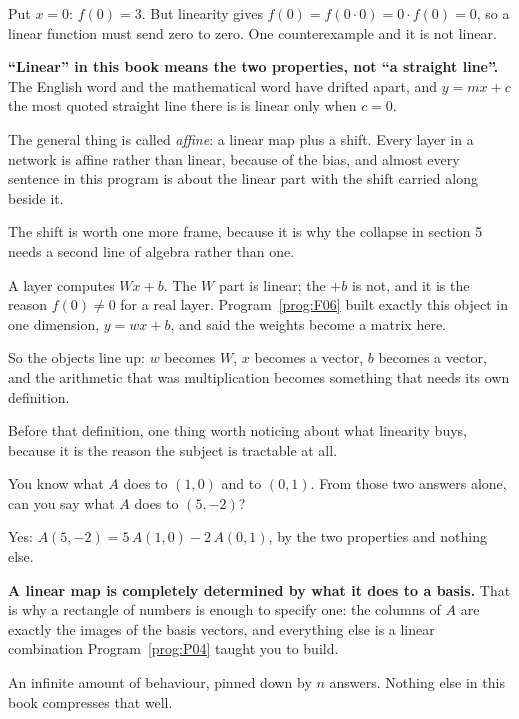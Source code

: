 \begin{fr}
Put $x = 0$: $f(0) = 3$. But linearity gives $f(0) = f(0 \cdot 0) = 0 \cdot
f(0) = 0$, so a linear function must send zero to zero. One counterexample and
it is not linear.

\begin{trapbox}
\textbf{\enquote{Linear} in this book means the two properties, not
\enquote{a straight line}.} The English word and the mathematical word have
drifted apart, and $y = mx + c$ \dash{} the most quoted straight line there is
\dash{} is linear only when $c = 0$.

The general thing is called \emph{affine}: a linear map plus a shift. Every
layer in a network is affine rather than linear, because of the bias, and
almost every sentence in this program is about the linear part with the shift
carried along beside it.
\end{trapbox}
\end{fr}

\begin{fr}
The shift is worth one more frame, because it is why the collapse in section 5
needs a second line of algebra rather than one.

A layer computes $Wx + b$. The $W$ part is linear; the $+ b$ is not, and it is
the reason $f(0) \neq 0$ for a real layer. Program~\ref{prog:F06} built exactly
this object in one dimension, $y = wx + b$, and said the weights become a
matrix here.

So the objects line up: $w$ becomes $W$, $x$ becomes a vector, $b$ becomes a
vector, and the arithmetic that was multiplication becomes something that
needs its own definition.
\end{fr}

\begin{fr}
Before that definition, one thing worth noticing about what linearity buys,
because it is the reason the subject is tractable at all.

You know what $A$ does to $(1, 0)$ and to $(0, 1)$. From those two answers
alone, can you say what $A$ does to $(5, -2)$?
\nextframe
\end{fr}

\begin{fr}
\begin{ansblock}
Yes: $A(5, -2) = 5\,A(1, 0) - 2\,A(0, 1)$, by the two properties and nothing
else.
\end{ansblock}

\textbf{A linear map is completely determined by what it does to a basis.}
That is why a rectangle of numbers is enough to specify one: the columns of $A$
are exactly the images of the basis vectors, and everything else is a linear
combination Program~\ref{prog:P04} taught you to build.

An infinite amount of behaviour, pinned down by $n$ answers. Nothing else in
this book compresses that well.
\end{fr}

